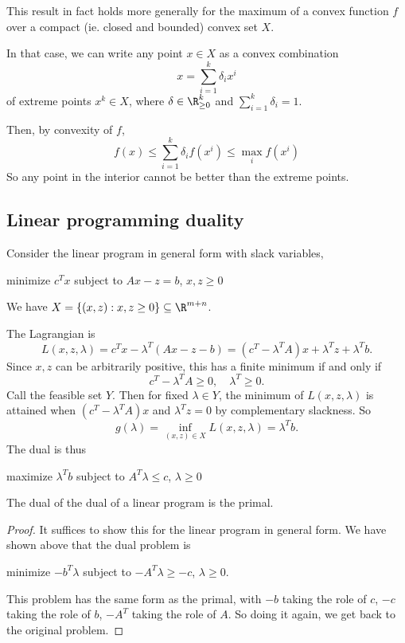 \documentclass[a4paper]{article}
\begin{document}
This result in fact holds more generally for the maximum of a convex function $f$ over a compact (ie. closed and bounded) convex set $X$.

In that case, we can write any point $x\in X$ as a convex combination
\[
  x = \sum_{i = 1}^k \delta_i x^i
\]
of extreme points $x^k\in X$, where $\delta \in \R_{\geq 0}^k$ and $\sum_{i=1}^k \delta_i = 1$.

Then, by convexity of $f$,
\[
  f(x) \leq \sum_{i = 1}^k \delta_i f(x^i) \leq \max_i f(x^i)
\]
So any point in the interior cannot be better than the extreme points.
\subsection{Linear programming duality}
Consider the linear program in general form with slack variables,
\begin{center}
  minimize $c^Tx$ subject to $Ax - z = b$, $x, z\geq 0$
\end{center}
We have $X = \{(x, z): x, z\geq 0\}\subseteq \R^{m + n}$.

The Lagrangian is
\[
  L(x, z, \lambda) = c^Tx - \lambda^T(A x - z - b) = (c^T - \lambda^TA)x + \lambda^T z + \lambda^T b.
\]
Since $x, z$ can be arbitrarily positive, this has a finite minimum if and only if
\[
  c^T - \lambda^TA \geq 0,\quad \lambda^T \geq 0.
\]
Call the feasible set $Y$. Then for fixed $\lambda\in Y$, the minimum of $L(x, z, \lambda)$ is attained when $(c^T - \lambda^T A)x$ and $\lambda^T z = 0$ by complementary slackness. So
\[
  g(\lambda) = \inf_{(x, z) \in X} L(x, z, \lambda) = \lambda^T b.
\]
The dual is thus
\begin{center}
  maximize $\lambda^T b$ subject to $A^T\lambda \leq c$, $\lambda \geq 0$
\end{center}

\begin{thm}[]
  The dual of the dual of a linear program is the primal.
\end{thm}

\begin{proof}
  It suffices to show this for the linear program in general form. We have shown above that the dual problem is
  \begin{center}
    minimize $-b^T\lambda$ subject to $-A^T \lambda \geq -c$, $\lambda \geq 0$.
  \end{center}
  This problem has the same form as the primal, with $-b$ taking the role of $c$, $-c$ taking the role of $b$, $-A^T$ taking the role of $A$. So doing it again, we get back to the original problem.
\end{proof}
\end{document}
